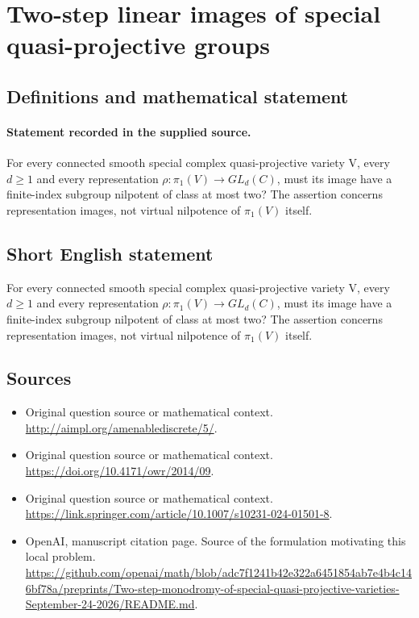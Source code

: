 \documentclass[11pt]{article}
\begin{document}
\section*{Two-step linear images of special quasi-projective groups}\label{30007067}
\subsection{Definitions and mathematical statement}
\paragraph{Statement recorded in the supplied source.}
For every connected smooth special complex quasi-projective variety V, every $d\geq 1$ and every representation $\rho :\pi _{1}(V)\to GL_d(C)$, must its image have a finite-index subgroup nilpotent of class at most two? The assertion concerns representation images, not virtual nilpotence of $\pi _{1}(V)$ itself.
\subsection{Short English statement}
For every connected smooth special complex quasi-projective variety V, every $d\geq 1$ and every representation $\rho :\pi _{1}(V)\to GL_d(C)$, must its image have a finite-index subgroup nilpotent of class at most two? The assertion concerns representation images, not virtual nilpotence of $\pi _{1}(V)$ itself.
\subsection{Sources}
\begin{itemize}
\item[S1] Original question source or mathematical context.
\url{http://aimpl.org/amenablediscrete/5/}.
\item[S2] Original question source or mathematical context.
\url{https://doi.org/10.4171/owr/2014/09}.
\item[S3] Original question source or mathematical context.
\url{https://link.springer.com/article/10.1007/s10231-024-01501-8}.
\item[S4] OpenAI, manuscript citation page. Source of the formulation motivating this local problem.
\url{https://github.com/openai/math/blob/adc7f1241b42e322a6451854ab7e4b4c146bf78a/preprints/Two-step-monodromy-of-special-quasi-projective-varieties-September-24-2026/README.md}.
\end{itemize}
\end{document}

